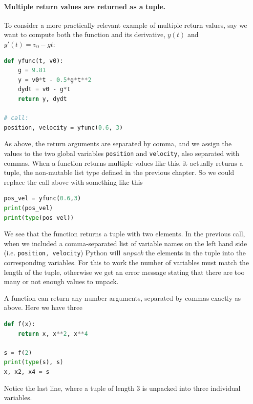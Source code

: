 \documentclass[graybox,envcountchap,sectrefs,final]{svmonodo}
\begin{document}
\paragraph{Multiple return values are returned as a tuple.}
To consider a more practically relevant example of multiple return values, say
we want to compute both the function and its derivative, $y(t)$ and $y'(t)=v_0-gt$:
\begin{lstlisting}[language=Python,style=blue1]
def yfunc(t, v0):
    g = 9.81
    y = v0*t - 0.5*g*t**2
    dydt = v0 - g*t
    return y, dydt

# call:
position, velocity = yfunc(0.6, 3)
\end{lstlisting}
As above, the return arguments are separated by comma, and we assign the values to the two global
variables \texttt{position} and \texttt{velocity}, also separated with commas. When a function returns multiple values like this,
it actually returns a tuple, the non-mutable list type defined in the previous chapter. So we could replace the
call above with something like this
\begin{lstlisting}[language=Python,style=blue1]
pos_vel = yfunc(0.6,3)
print(pos_vel)
print(type(pos_vel))
\end{lstlisting}
We see that the function returns a tuple with two elements. In the previous call, when we included a comma-separated list
of variable names on the left hand side (i.e. \texttt{position, velocity}) Python will \emph{unpack} the elements in the tuple into the
corresponding variables. For this to work the number of variables must match the length of the tuple, otherwise we get
an error message stating that there are too many or not enough values to unpack.

A function can return any number arguments, separated by commas exactly as above. Here we have three
\begin{lstlisting}[language=Python,style=blue1]
def f(x):
    return x, x**2, x**4

s = f(2)
print(type(s), s)
x, x2, x4 = s
\end{lstlisting}
Notice the last line, where a tuple of length 3 is unpacked into three individual variables.
\end{document}

